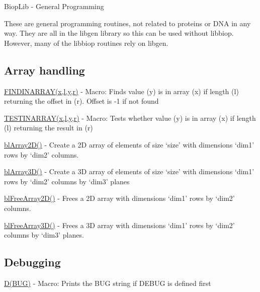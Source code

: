 Biop\-Lib -\/ General Programming

These are general programming routines, not related to proteins or D\-N\-A in any way. They are all in the libgen library so this can be used without libbiop. However, many of the libbiop routines rely on libgen.

\subsection*{Array handling }


\begin{DoxyItemize}
\item \hyperlink{macros_8h_a81b8341e8468f5883b4487072409c9bc}{F\-I\-N\-D\-I\-N\-A\-R\-R\-A\-Y(x,l,y,r)} -\/ Macro\-: Finds value (y) is in array (x) if length (l) returning the offset in (r). Offset is -\/1 if not found
\item \hyperlink{macros_8h_a0af07934c7ed745d41434d2b7d0b1d65}{T\-E\-S\-T\-I\-N\-A\-R\-R\-A\-Y(x,l,y,r)} -\/ Macro\-: Tests whether value (y) is in array (x) if length (l) returning the result in (r)
\item \hyperlink{array_8h_a39af89e09b89710340b965e39cc7ac90}{bl\-Array2\-D()} -\/ Create a 2\-D array of elements of size `size' with dimensions `dim1' rows by `dim2' columns.
\item \hyperlink{array_8h_a36eab413bdc4c6528833e2cadd426c6a}{bl\-Array3\-D()} -\/ Create a 3\-D array of elements of size `size' with dimensions `dim1' rows by `dim2' columns by `dim3' planes
\item \hyperlink{array_8h_a84d0e26dfc099f32311a7e21256e24b2}{bl\-Free\-Array2\-D()} -\/ Frees a 2\-D array with dimensions `dim1' rows by `dim2' columns.
\item \hyperlink{array_8h_ae6221c1d22d4ba567ef07f44594d051a}{bl\-Free\-Array3\-D()} -\/ Frees a 3\-D array with dimensions `dim1' rows by `dim2' columns by `dim3' planes.
\end{DoxyItemize}

\subsection*{Debugging }


\begin{DoxyItemize}
\item \hyperlink{macros_8h_a62e0f7e259f149c4e32b37eca4c0bd29}{D(\-B\-U\-G)} -\/ Macro\-: Prints the B\-U\-G string if D\-E\-B\-U\-G is defined first
\end{DoxyItemize}

